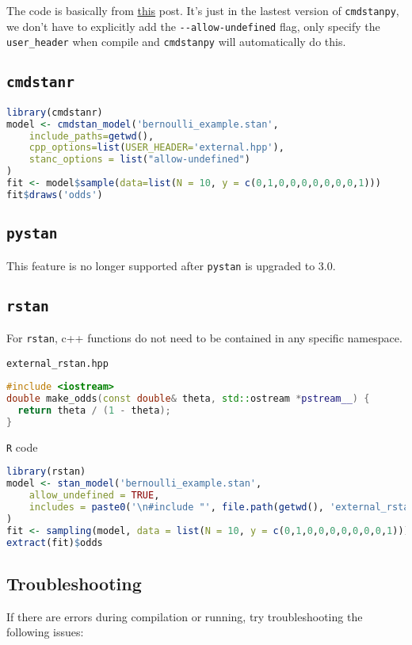 \documentclass[11pt]{article}
\begin{document}
The code is basically from \href{https://mc-stan.org/cmdstanpy/users-guide/examples/Using\%20External\%20C\%2B\%2B.html#}{this} post. It's just in the lastest version of \verb|cmdstanpy|, we don't have to explicitly add the \verb|--allow-undefined| flag, only specify the \verb|user_header| when compile and \verb|cmdstanpy| will automatically do this.


\cprotect\subsection{\verb|cmdstanr|}
\begin{lstlisting}[language=r, style=lgeneral]
library(cmdstanr)
model <- cmdstan_model('bernoulli_example.stan', 
    include_paths=getwd(),
    cpp_options=list(USER_HEADER='external.hpp'),
    stanc_options = list("allow-undefined")
)
fit <- model$sample(data=list(N = 10, y = c(0,1,0,0,0,0,0,0,0,1)))
fit$draws('odds')
\end{lstlisting}


\cprotect\subsection{\verb|pystan|}
This feature is no longer supported after \verb|pystan| is upgraded to 3.0.



\cprotect\subsection{\verb|rstan|}
For \verb|rstan|, c++ functions do not need to be contained in any specific namespace. 

\verb|external_rstan.hpp|
\begin{lstlisting}[language=c++, style=lgeneral]
#include <iostream>
double make_odds(const double& theta, std::ostream *pstream__) {
  return theta / (1 - theta);
}
\end{lstlisting}

\verb|R| code
\begin{lstlisting}[language=r, style=lgeneral]
library(rstan)
model <- stan_model('bernoulli_example.stan', 
    allow_undefined = TRUE,
    includes = paste0('\n#include "', file.path(getwd(), 'external_rstan.hpp'), '"\n'),
)
fit <- sampling(model, data = list(N = 10, y = c(0,1,0,0,0,0,0,0,0,1)))
extract(fit)$odds	
\end{lstlisting}




\subsection{Troubleshooting}
If there are errors during compilation or running, try troubleshooting the following issues:
\end{document}
